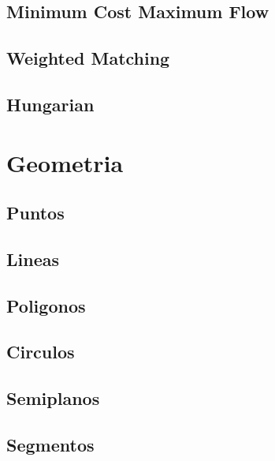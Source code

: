 \subsection{Minimum Cost Maximum Flow}
\raggedbottom
\hrulefill
\subsection{Weighted Matching}
\raggedbottom
\hrulefill
\subsection{Hungarian}
\raggedbottom
\hrulefill

\section{Geometria}
\subsection{Puntos}
\raggedbottom
\hrulefill
\subsection{Lineas}
\raggedbottom
\hrulefill
\subsection{Poligonos}
\raggedbottom
\hrulefill
\subsection{Circulos}
\raggedbottom
\hrulefill
\subsection{Semiplanos}
\raggedbottom
\hrulefill
\subsection{Segmentos}
\raggedbottom
\hrulefill
